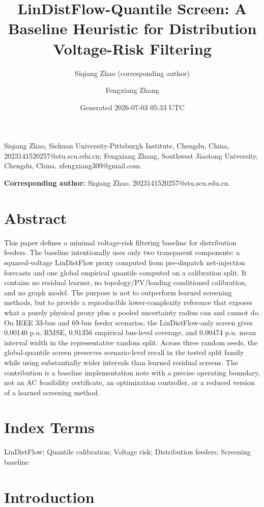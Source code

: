 \documentclass[
  journal]{IEEEtran}
\title{LinDistFlow-Quantile Screen: A Baseline Heuristic for
Distribution Voltage-Risk Filtering}
\author{Siqiang Zhao (corresponding author) \and Fengxiang Zhang}
\date{Generated 2026-07-03 05:33 UTC}
\begin{document}
\maketitle

Siqiang Zhao, Sichuan University-Pittsburgh Institute, Chengdu, China,
2023141520257@stu.scu.edu.cn; Fengxiang Zhang, Southwest Jiaotong
University, Chengdu, China, zfengxiang309@gmail.com.

\textbf{Corresponding author:} Siqiang Zhao,
2023141520257@stu.scu.edu.cn.

\section*{Abstract}\label{abstract}

This paper defines a minimal voltage-risk filtering baseline for
distribution feeders. The baseline intentionally uses only two
transparent components: a squared-voltage LinDistFlow proxy computed
from pre-dispatch net-injection forecasts and one global empirical
quantile computed on a calibration split. It contains no residual
learner, no topology/PV/loading conditioned calibration, and no graph
model. The purpose is not to outperform learned screening methods, but
to provide a reproducible lower-complexity reference that exposes what a
purely physical proxy plus a pooled uncertainty radius can and cannot
do. On IEEE 33-bus and 69-bus feeder scenarios, the LinDistFlow-only
screen gives 0.00140 p.u. RMSE, 0.91356 empirical bus-level coverage,
and 0.00474 p.u. mean interval width in the representative random split.
Across three random seeds, the global-quantile screen preserves
scenario-level recall in the tested split family while using
substantially wider intervals than learned residual screens. The
contribution is a baseline implementation note with a precise operating
boundary, not an AC feasibility certificate, an optimization controller,
or a reduced version of a learned screening method.

\section*{Index Terms}\label{index-terms}

LinDistFlow; Quantile calibration; Voltage risk; Distribution feeders;
Screening baseline

\section{Introduction}\label{introduction}
\end{document}
